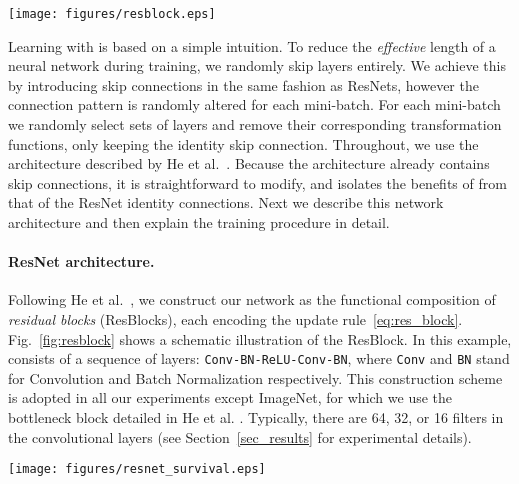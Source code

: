 \documentclass[runningheads]{llncs}
\begin{document}
\label{sec_method}



\begin{figure*}[t]
	\begin{center}
		\vspace{-2ex}
		\centerline{\texttt{[image: figures/resblock.eps]}}
		\vspace{-2ex}
		\caption{A close look at the  ResBlock in a ResNet.\label{fig:resblock}}
		\vspace{-6ex}
	\end{center}
\end{figure*}

Learning with \name{} is based on a simple intuition. To reduce the \emph{effective} length of a neural network during training, we randomly skip layers entirely. We achieve this by introducing skip connections in the same fashion as ResNets, however the connection pattern is randomly altered for each mini-batch. For each mini-batch we randomly select sets of layers and remove their corresponding transformation functions, only keeping the identity skip connection.
Throughout, we use the architecture described by He et al.~\cite{he2015deep}. Because the architecture already contains skip connections, it is straightforward to modify, and isolates the benefits of \name{} from that of the ResNet identity connections. Next we describe this network architecture and then explain the \name{} training procedure in detail.

\paragraph{\textbf{ResNet architecture.}}
Following He et al.~\cite{he2015deep}, we construct our network as the functional composition of  \emph{residual blocks} (ResBlocks), each encoding the update rule~\eqref{eq:res_block}.  Fig.~\ref{fig:resblock} shows a schematic illustration of the  ResBlock. In this example,  consists of a sequence of layers: {\tt Conv-BN-ReLU-Conv-BN}, where {\tt Conv} and {\tt BN} stand for Convolution and Batch Normalization respectively.
This construction scheme is adopted in all our experiments except ImageNet, for which we use the bottleneck block detailed in He et al. \cite{he2015deep}. Typically, there are 64, 32, or 16 filters in the convolutional layers (see Section~\ref{sec_results} for experimental details).

\begin{figure*}[t]
	\begin{center}
		\vspace{-2ex}
		\centerline{\texttt{[image: figures/resnet\_survival.eps]}}
		\caption{The linear decay of  illustrated on a ResNet with \name{} for  and . Conceptually, we treat the input to the first ResBlock as , which is always active.}
    \label{figure.lin_decay}
		\vspace{-6ex}
	\end{center}
\end{figure*}
\end{document}
